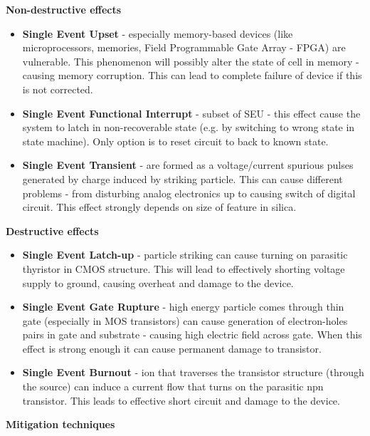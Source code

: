         \bigskip\textbf{Non-destructive effects}
        \begin{itemize}
            \item \textbf{Single Event Upset} - especially memory-based devices (like microprocessors, memories, Field Programmable Gate Array - FPGA) are vulnerable. This phenomenon will possibly alter the state of cell in memory - causing memory corruption. This can lead to complete failure of device if this is not corrected.

            \item \textbf{Single Event Functional Interrupt} - subset of SEU - this effect cause the system to latch in non-recoverable state (e.g. by switching to wrong state in state machine). Only option is to reset circuit to back to known state.

            \item \textbf{Single Event Transient} - are formed as a voltage/current spurious pulses generated by charge induced by striking particle. This can cause different problems - from disturbing analog electronics up to causing switch of digital circuit. This effect strongly depends on size of feature in silica.
        \end{itemize}

        \bigskip\textbf{Destructive effects}
        \begin{itemize}
            \item \textbf{Single Event Latch-up} - particle striking can cause turning on parasitic thyristor in CMOS structure. This will lead to effectively shorting voltage supply to ground, causing overheat and damage to the device.

            \item \textbf{Single Event Gate Rupture} - high energy particle comes through thin gate (especially in MOS transistors) can cause generation of electron-holes pairs in gate and substrate - causing high electric field across gate. When this effect is strong enough it can cause permanent damage to transistor.

            \item \textbf{Single Event Burnout} - ion that traverses the transistor structure (through the source) can induce a current flow that turns on the parasitic npn transistor. This leads to effective short circuit and damage to the device.
        \end{itemize}

        \bigskip\textbf{Mitigation techniques}

